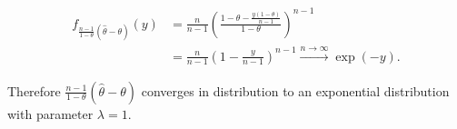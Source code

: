 \begin{solution}
\begin{enumerate}[label = (\alph*)]
  \begin{align*}
    f_{\frac{n - 1}{1 - \theta}(\hat{\theta} - \theta)}(y) &= \frac{n}{n - 1}
    \left(\frac{1 - \theta  - \frac{y(1 - \theta)}{n - 1}}{1 - \theta}\right)^{n-1} \\
    &= \frac{n}{n - 1}\left(1 - \frac{y}{n-1}\right)^{n-1}
    \xrightarrow{n \to \infty} \exp(-y).
  \end{align*}

  Therefore $\frac{n - 1}{1 - \theta}(\hat{\theta} - \theta)$ converges
  in distribution to an exponential distribution with parameter $\lambda = 1$.

\end{enumerate}

\end{solution}

